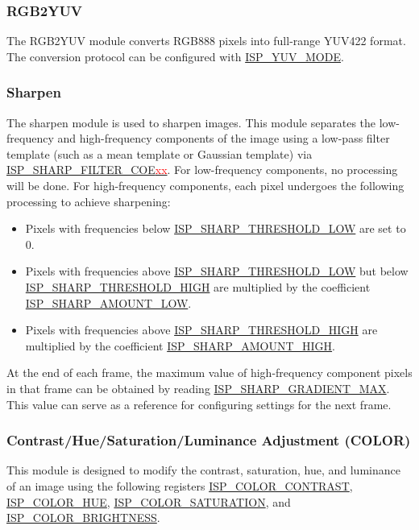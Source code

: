 \documentclass[main\_\_EN.tex]{subfiles}
\begin{document}
\subsubsection{RGB2YUV}
\label{sec:isp_rgb2yuv}
The RGB2YUV module converts RGB888 pixels into full-range YUV422 format. The conversion protocol can be configured with \hyperref[fielddesc:ISPYUVMODE]{ISP\_YUV\_MODE}.


\subsubsection{Sharpen}
\label{sec:isp_sharpen}
The sharpen module is used to sharpen images. This module separates the low-frequency and high-frequency components of the image using a low-pass filter template (such as a mean template or Gaussian template) via \hyperref[fielddesc:ISPSHARPFILTERCOE00]{ISP\_SHARP\_FILTER\_COE\textcolor{red}{xx}}. For low-frequency components, no processing will be done. For high-frequency components, each pixel undergoes the following processing to achieve sharpening:
\begin{itemize}
    \item Pixels with frequencies below \hyperref[fielddesc:ISPSHARPTHRESHOLDLOW]{ISP\_SHARP\_THRESHOLD\_LOW} are set to 0.
    \item Pixels with frequencies above \hyperref[fielddesc:ISPSHARPTHRESHOLDLOW]{ISP\_SHARP\_THRESHOLD\_LOW} but below \hyperref[fielddesc:ISPSHARPTHRESHOLDHIGH]{ISP\_SHARP\_THRESHOLD\_HIGH} are multiplied by the coefficient \hyperref[fielddesc:ISPSHARPAMOUNTLOW]{ISP\_SHARP\_AMOUNT\_LOW}.
    \item Pixels with frequencies above \hyperref[fielddesc:ISPSHARPTHRESHOLDHIGH]{ISP\_SHARP\_THRESHOLD\_HIGH} are multiplied by the coefficient \hyperref[fielddesc:ISPSHARPAMOUNTHIGH]{ISP\_SHARP\_AMOUNT\_HIGH}.
\end{itemize}

At the end of each frame, the maximum value of high-frequency component pixels in that frame can be obtained by reading \hyperref[fielddesc:ISPSHARPGRADIENTMAX]{ISP\_SHARP\_GRADIENT\_MAX}. This value can serve as a reference for configuring settings for the next frame.


\subsubsection{Contrast/Hue/Saturation/Luminance Adjustment (COLOR)}

This module is designed to modify the contrast, saturation, hue, and luminance of an image using the following registers \hyperref[fielddesc:ISPCOLORCONTRAST]{ISP\_COLOR\_CONTRAST}, \hyperref[fielddesc:ISPCOLORHUE]{ISP\_COLOR\_HUE}, \hyperref[fielddesc:ISPCOLORSATURATION]{ISP\_COLOR\_SATURATION}, and \hyperref[fielddesc:ISPCOLORBRIGHTNESS]{ISP\_COLOR\_BRIGHTNESS}.
\end{document}
